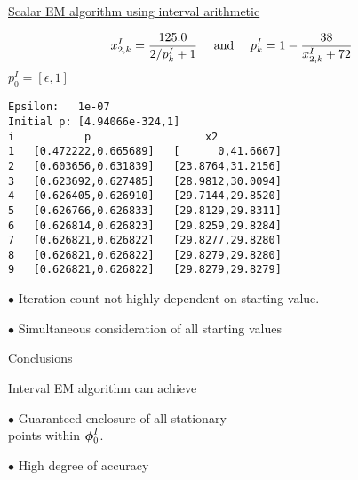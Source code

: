 \documentclass{slides}
\begin{document}
\renewcommand{\baselinestretch}{1}
\begin{slide}
\begin{center}
\underline{Scalar EM algorithm using interval arithmetic}
\end{center}
$$
x^I_{2,k} = \frac{125.0}{2 / p_k^I+1} \mbox{ \quad and \quad}
p^I_k = 1 - \frac{38}{x_{2,k}^I + 72}
$$
$p_0^I = [\epsilon,1]$ 
\begin{verbatim}
Epsilon:   1e-07
Initial p: [4.94066e-324,1]
i           p                  x2
1   [0.472222,0.665689]   [      0,41.6667]
2   [0.603656,0.631839]   [23.8764,31.2156]
3   [0.623692,0.627485]   [28.9812,30.0094]
4   [0.626405,0.626910]   [29.7144,29.8520]
5   [0.626766,0.626833]   [29.8129,29.8311]
6   [0.626814,0.626823]   [29.8259,29.8284]
7   [0.626821,0.626822]   [29.8277,29.8280]
8   [0.626821,0.626822]   [29.8279,29.8280]
9   [0.626821,0.626822]   [29.8279,29.8279]
\end{verbatim}
\end{slide}
\begin{note}
$\bullet$ Iteration count not highly dependent on starting value.

$\bullet$ Simultaneous consideration of all starting values 
\end{note}
\bs
\begin{center}
\underline{Conclusions}
\end{center}

Interval EM algorithm can achieve

$\bullet$ Guaranteed enclosure of all stationary \\
points within $\mbox{\boldmath $\phi$}_0^I$.

$\bullet$ High degree of accuracy
\es
\end{document}
